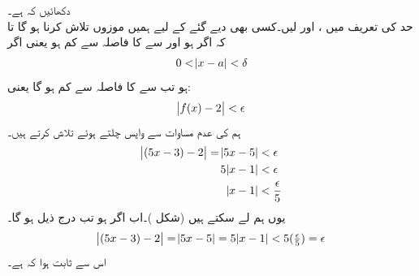 دکھائیں کہ  ہے۔\\
حد کی تعریف میں ،  اور  لیں۔کسی بھی دیے گئے   کے لیے ہمیں موزوں  تلاش کرنا ہو گا تا کہ اگر  ہو اور  سے  کا فاصلہ  سے کم ہو یعنی اگر
\begin{align*}
0<\abs{x-a}<\delta
\end{align*}
ہو تب  سے  کا فاصلہ  سے کم ہو گا یعنی:
\begin{align*}
\abs{f(x)-2}<\epsilon
\end{align*}
ہم  کی عدم مساوات سے واپس چلتے ہوئے  تلاش کرتے ہیں۔
\begin{align*}
\abs{(5x-3)-2}=\abs{5x-5}&<\epsilon\\
5\abs{x-1}&<\epsilon\\
\abs{x-1}&<\frac{\epsilon}{5}
\end{align*}
یوں ہم  لے سکتے ہیں (شکل )۔اب اگر  ہو تب درج ذیل ہو گا۔
\begin{align*}
\abs{(5x-3)-2}=\abs{5x-5}=5\abs{x-1}<5(\tfrac{\epsilon}{5})=\epsilon
\end{align*}
اس سے ثابت ہوا کہ  ہے۔

